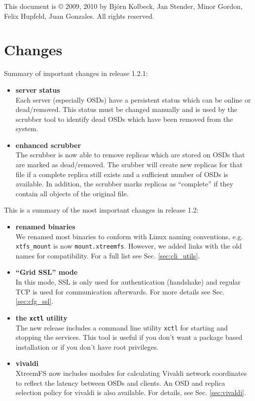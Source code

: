 \documentclass[a4paper,10pt]{book}
\begin{document}
This document is \copyright{} 2009, 2010 by Bj\"orn Kolbeck, Jan Stender, Minor Gordon, Felix Hupfeld, Juan Gonzales. All rights reserved.

\setcounter{tocdepth}{10}
\tableofcontents

\chapter*{Changes}

Summary of important changes in release 1.2.1:

\begin{itemize}
 \item \textbf{server status}\\
 Each server (especially OSDs) have a persistent status which can be online or dead/removed. This status must be changed manually and is used by the scrubber tool to identify dead OSDs which have been removed from the system.
 \item \textbf{enhanced scrubber}\\
 The scrubber is now able to remove replicas which are stored on OSDs that are marked as dead/removed. The srubber will create new replicas for that file if a complete replica still exists and a sufficient number of OSDs is available. In addition, the scrubber marks replicas as ``complete'' if they contain all objects of the original file.
\end{itemize}


This is a summary of the most important changes in release 1.2:

\begin{itemize}
 \item \textbf{renamed binaries}\\
 We renamed most binaries to conform with Linux naming conventions, e.g. \texttt{xtfs\_mount} is now \texttt{mount.xtreemfs}. However, we added links with the old names for compatibility. For a full list see Sec. \ref{sec:cli_utils}. 

 \item \textbf{``Grid SSL'' mode}\\
 In this mode, SSL is only used for authentication (handshake) and regular TCP is used for communication afterwards. For more details see Sec. \ref{sec:cfg_ssl}.

 \item \textbf{the \texttt{xctl} utility}\\
 The new release includes a command line utility \texttt{xctl} for starting and stopping the services. This tool is useful if you don't want a package based installation or if you don't have root privileges.

 \item \textbf{vivaldi}\\
 XtreemFS now includes modules for calculating Vivaldi network coordinates to reflect the latency between OSDs and clients. An OSD and replica selection policy for vivaldi is also available. For details, see Sec. \ref{sec:vivaldi}.

\end{itemize}
\end{document}
